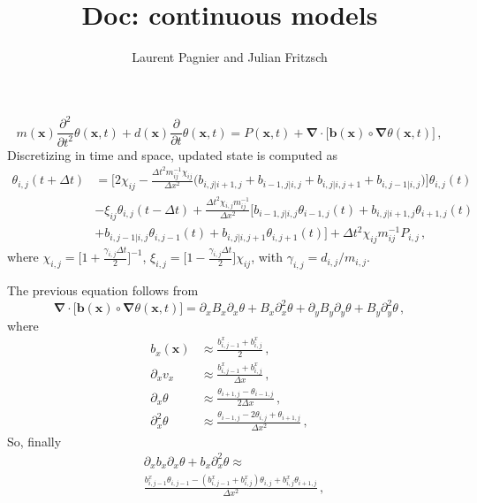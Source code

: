 \documentclass[notitlepage]{revtex4-2}
\begin{document}
\title{Doc: continuous models}
\author{Laurent Pagnier and Julian Fritzsch}
\maketitle


\begin{equation}
m(\bm x)\frac{\partial^2}{\partial t^2}\theta(\bm x,t)+d(\bm x)\frac{\partial}{\partial t}\theta(\bm x,t)=P(\bm x,t)+\bm\nabla\cdot\big[\bm b(\bm x)\circ\bm\nabla\theta(\bm x,t)\big]\,,
\end{equation}
Discretizing in time and space, updated state is computed as 
\begin{align}
\theta_{i,j}(t+\Delta t) &= 
\bigg[2\chi_{ij} -\frac{\Delta t^2 m_{ij}^{-1}\chi_{ij}}{\Delta x^2}\Big(b_{i,j|i+1,j}+b_{i-1,j|i,j}+b_{i,j|i,j+1}+b_{i,j-1|i,j}\Big)\bigg]\theta_{i,j}(t)\nonumber\\
&-\xi_{ij}\theta_{i,j}(t-\Delta t) +\frac{\Delta t^2 \chi_{i,j}m_{ij}^{-1}}{\Delta x^2}\bigg[b_{i-1,j|i,j}\theta_{i-1,j}(t)+b_{i,j|i+1,j}\theta_{i+1,j}(t)\nonumber\\
&+b_{i,j-1|i,j}\theta_{i,j-1}(t)
+b_{i,j|i,j+1}\theta_{i,j+1}(t)\bigg] + \Delta t^2 \chi_{ij} m_{ij}^{-1}P_{i,j}\,,
\end{align}
where $\chi_{i,j}=\Big[1+\frac{\gamma_{i,j}\Delta t}{2}\Big]^{-1}$, $\xi_{i,j}=\Big[1-\frac{\gamma_{i,j}\Delta t}{2}\Big]\chi_{ij}$, with $\gamma_{i,j}=d_{i,j}/m_{i,j}$.

The previous equation follows from
\begin{equation}
\bm\nabla\cdot\big[\bm b(\bm x)\circ\bm\nabla\theta(\bm x,t)\big]=\partial_xB_x\partial_x\theta+B_x\partial_x^2\theta +\partial_yB_y\partial_y\theta+B_y\partial_y^2\theta\,,
\end{equation}
where
\begin{align}
b_x(\bm x)&\approx\frac{b^x_{i,j-1}+b^x_{i,j}}{2}\,,\\
\partial_xv_x&\approx\frac{b^x_{i,j-1}+b^x_{i,j}}{\Delta x}\,,\\
\partial_x\theta&\approx\frac{\theta_{i+1,j}-\theta_{i-1,j}}{2\Delta x}\,,\\
\partial_x^2\theta&\approx\frac{\theta_{i-1,j}-2\theta_{i,j}+\theta_{i+1,j}}{\Delta x^2}\,,
\end{align}
So, finally
\begin{align}
&\partial_xb_x\partial_x\theta+b_x\partial_x^2\theta\approx\\
&\frac{b^x_{i,j-1}\theta_{i,j-1}-(b^x_{i,j-1}+b^x_{i,j})\theta_{i,j}+b^x_{i,j}\theta_{i+1,j}}{\Delta x^2}\,,
\end{align}
\end{document}
